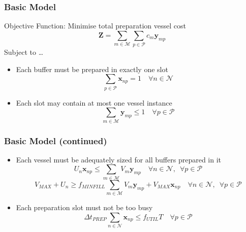 \documentclass{beamer}
\begin{document}
\begin{frame}
    \frametitle{Basic Model}
    Objective Function: Minimise total preparation vessel cost\\
    \begin{equation}
        \boldsymbol{Z} = \sum_{m \in \mathcal{M}} \sum_{p \in \mathcal{P}} c_m
        \boldsymbol{y}_{mp}
    \end{equation}
    Subject to \ldots
    \begin{itemize}
    \item Each buffer must be prepared in exactly one slot\\
    \begin{equation}
        \sum_{p \in \mathcal{P}} \boldsymbol{x}_{np} = 1 \quad \forall n \in 
        \mathcal{N}
    \end{equation}
    \item Each slot may contain at most one vessel instance
    \begin{equation}
        \sum_{m \in \mathcal{M}} \boldsymbol{y}_{mp} \le 1 \quad \forall p \in 
        \mathcal{P}
    \end{equation}
    \end{itemize}
\end{frame}

\begin{frame}
    \frametitle{Basic Model (continued)}
    \begin{itemize}
    \item Each vessel must be adequately sized for all buffers prepared in it
    \begin{equation}
        U_{n} \boldsymbol{x}_{np} \le \sum_{m \in \mathcal{M}} V_{m}
        \boldsymbol{y}_{mp} \quad \forall n \in \mathcal{N}, \enspace \forall
        p \in \mathcal{P}
    \end{equation}
    \begin{equation}
        V_{\mathit{MAX}} + U_{n} \ge 
        f_{\mathit{MINFILL}} \sum_{m \in \mathcal{M}} V_{m} \boldsymbol{y}_{mp}
        + V_{\mathit{MAX}} \boldsymbol{x}_{np} 
        \quad \forall n \in \mathcal{N}, \enspace \forall p \in \mathcal{P}
    \end{equation}
    \item Each preparation slot must not be too busy
    \begin{equation}
        \Delta t_{\mathit{PREP}} \sum_{n \in \mathcal{N}} \boldsymbol{x}_{np}
        \le f_{\mathit{UTIL}} T \quad \forall p \in \mathcal{P}
    \end{equation}
    \end{itemize}
\end{frame}
\end{document}
